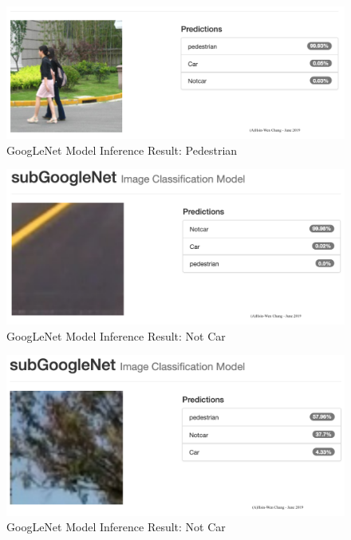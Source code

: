 \documentclass[10pt,journal,compsoc]{IEEEtran}
\begin{document}
\begin{figure}[thpb]
      \centering
      \includegraphics[width=\linewidth]{GoogLenetPed.png}
      \caption{GoogLeNet Model Inference Result: Pedestrian}
      \label{fig:robot1}
\end{figure}
\begin{figure}[thpb]
      \centering
      \includegraphics[width=\linewidth]{notCarInferenceGoodResult.png}
      \caption{GoogLeNet Model Inference Result: Not Car}
      \label{fig:robot1}
\end{figure}
\begin{figure}[thpb]
      \centering
      \includegraphics[width=\linewidth]{NotCarInference.png}
      \caption{GoogLeNet Model Inference Result: Not Car}
      \label{fig:robot1}
\end{figure}
\end{document}
